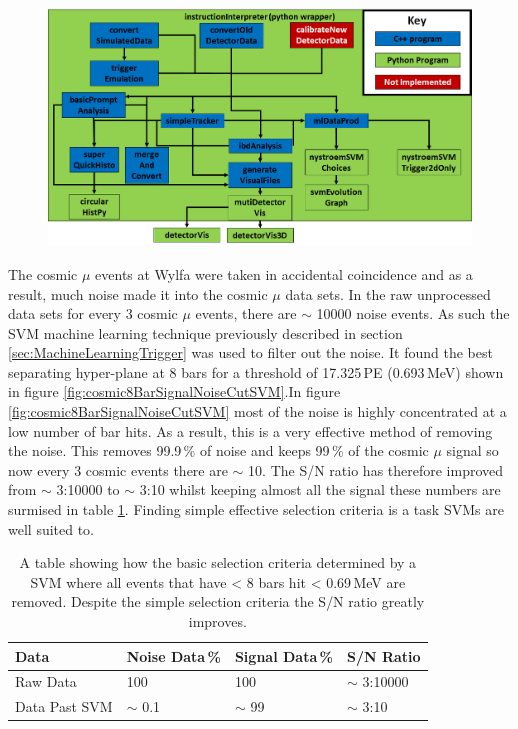 \begin{figure}[!h]
 \centering
 \includegraphics[width=0.8\linewidth]{Chapter5/Figs/Raster/analysisChainRevisedAgain.png}
 \label{fig:analysisChain}
\end{figure}

The cosmic $\mu$ events at Wylfa were taken in accidental coincidence and as a result, much noise made it into the cosmic $\mu$ data sets. In the raw unprocessed data sets for every 3 cosmic $\mu$ events, there are $\sim$ 10000 noise events. As such the SVM machine learning technique previously described in section \ref{sec:MachineLearningTrigger} was used to filter out the noise. It found the best separating hyper-plane at 8 bars for a threshold of 17.325\,PE (0.693\,MeV) shown in figure \ref{fig:cosmic8BarSignalNoiseCutSVM}.In figure \ref{fig:cosmic8BarSignalNoiseCutSVM}  most of the noise is highly concentrated at a low number of bar hits. As a result, this is a very effective method of removing the noise. This removes 99.9\,\% of noise and keeps 99\,\% of the cosmic $\mu$ signal so now every 3 cosmic events there are $\sim$ 10. The S/N ratio has therefore improved from $\sim$ 3:10000 to $\sim$ 3:10 whilst keeping almost all the signal these numbers are surmised in table \ref{tab:snRatioSvm}. Finding simple effective selection criteria is a task SVMs are well suited to. 

\begin{table}[!h]
\centering
\begin{tabular}{llll}  
\toprule
Data          & Noise Data\,\% & Signal Data\,\% & S/N Ratio \\
\midrule
Raw Data      & 100            & 100             & $\sim$ 3:10000\\
Data Past SVM & $\sim$ 0.1     & $\sim$ 99       & $\sim$ 3:10\\
\bottomrule  
\end{tabular}
\caption{A table showing how the basic selection criteria determined by a SVM where all events that have < 8 bars hit < 0.69\,MeV are removed. Despite the simple selection criteria the S/N ratio greatly improves.}
\label{tab:snRatioSvm}
\end{table}

